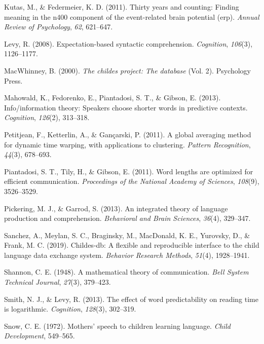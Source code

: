 \documentclass[10pt, letterpaper]{article}
\begin{document}
\leavevmode\hypertarget{ref-kutas2011}{}%
Kutas, M., \& Federmeier, K. D. (2011). Thirty years and counting:
Finding meaning in the n400 component of the event-related brain
potential (erp). \emph{Annual Review of Psychology}, \emph{62},
621--647.

\leavevmode\hypertarget{ref-levy2008}{}%
Levy, R. (2008). Expectation-based syntactic comprehension.
\emph{Cognition}, \emph{106}(3), 1126--1177.

\leavevmode\hypertarget{ref-macwhinney2000}{}%
MacWhinney, B. (2000). \emph{The childes project: The database} (Vol.
2). Psychology Press.

\leavevmode\hypertarget{ref-mahowald2013}{}%
Mahowald, K., Fedorenko, E., Piantadosi, S. T., \& Gibson, E. (2013).
Info/information theory: Speakers choose shorter words in predictive
contexts. \emph{Cognition}, \emph{126}(2), 313--318.

\leavevmode\hypertarget{ref-petitjean2011}{}%
Petitjean, F., Ketterlin, A., \& Gançarski, P. (2011). A global
averaging method for dynamic time warping, with applications to
clustering. \emph{Pattern Recognition}, \emph{44}(3), 678--693.

\leavevmode\hypertarget{ref-piantadosi2011}{}%
Piantadosi, S. T., Tily, H., \& Gibson, E. (2011). Word lengths are
optimized for efficient communication. \emph{Proceedings of the National
Academy of Sciences}, \emph{108}(9), 3526--3529.

\leavevmode\hypertarget{ref-pickering2013}{}%
Pickering, M. J., \& Garrod, S. (2013). An integrated theory of language
production and comprehension. \emph{Behavioral and Brain Sciences},
\emph{36}(4), 329--347.

\leavevmode\hypertarget{ref-sanchez2019}{}%
Sanchez, A., Meylan, S. C., Braginsky, M., MacDonald, K. E., Yurovsky,
D., \& Frank, M. C. (2019). Childes-db: A flexible and reproducible
interface to the child language data exchange system. \emph{Behavior
Research Methods}, \emph{51}(4), 1928--1941.

\leavevmode\hypertarget{ref-shannon1948}{}%
Shannon, C. E. (1948). A mathematical theory of communication.
\emph{Bell System Technical Journal}, \emph{27}(3), 379--423.

\leavevmode\hypertarget{ref-smith2013}{}%
Smith, N. J., \& Levy, R. (2013). The effect of word predictability on
reading time is logarithmic. \emph{Cognition}, \emph{128}(3), 302--319.

\leavevmode\hypertarget{ref-snow1972}{}%
Snow, C. E. (1972). Mothers' speech to children learning language.
\emph{Child Development}, 549--565.
\end{document}
